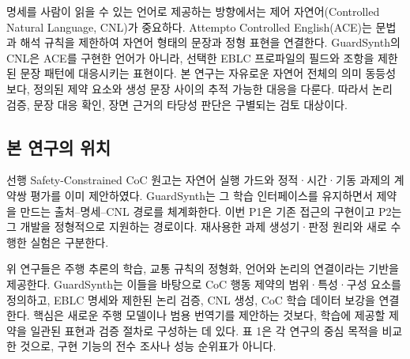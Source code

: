 \documentclass[10pt,a4paper,twocolumn]{article}\usepackage[margin=18mm]{geometry}\usepackage{fontspec,kotex}
\begin{document}
명세를 사람이 읽을 수 있는 언어로 제공하는 방향에서는 제어 자연어(Controlled Natural Language, CNL)가 중요하다. Attempto Controlled English(ACE)는 문법과 해석 규칙을 제한하여 자연어 형태의 문장과 정형 표현을 연결한다. GuardSynth의 CNL은 ACE를 구현한 언어가 아니라, 선택한 EBLC 프로파일의 필드와 조항을 제한된 문장 패턴에 대응시키는 표현이다. 본 연구는 자유로운 자연어 전체의 의미 동등성보다, 정의된 제약 요소와 생성 문장 사이의 추적 가능한 대응을 다룬다. 따라서 논리 검증, 문장 대응 확인, 장면 근거의 타당성 판단은 구별되는 검토 대상이다. \cite{r10}\par

\subsection{본 연구의 위치}

선행 Safety-Constrained CoC 원고는 자연어 실행 가드와 정적·시간·기동 과제의 계약쌍 평가를 이미 제안하였다. GuardSynth는 그 학습 인터페이스를 유지하면서 제약을 만드는 출처--명세--CNL 경로를 체계화한다. 이번 P1은 기존 접근의 구현이고 P2는 그 개발을 정형적으로 지원하는 경로이다. 재사용한 과제 생성기·판정 원리와 새로 수행한 실험은 구분한다. \cite{r4}\par

위 연구들은 주행 추론의 학습, 교통 규칙의 정형화, 언어와 논리의 연결이라는 기반을 제공한다. GuardSynth는 이들을 바탕으로 CoC 행동 제약의 범위·특성·구성 요소를 정의하고, EBLC 명세와 제한된 논리 검증, CNL 생성, CoC 학습 데이터 보강을 연결한다. 핵심은 새로운 주행 모델이나 범용 번역기를 제안하는 것보다, 학습에 제공할 제약을 일관된 표현과 검증 절차로 구성하는 데 있다. 표 1은 각 연구의 중심 목적을 비교한 것으로, 구현 기능의 전수 조사나 성능 순위표가 아니다.\par
\end{document}
